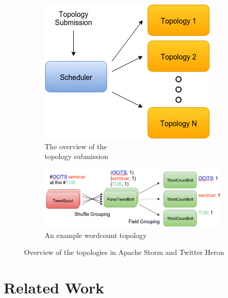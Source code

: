 \documentclass[conference]{IEEEtran}
\begin{document}
\begin{figure}[!h]
\centering
	\begin{subfigure}{.55\columnwidth}
		\includegraphics[width=\columnwidth]{figures/TopologySubmission}
		\caption{The overview of the \\topology submission}
		\label{fig:TopologySubmission}
	\end{subfigure}\hspace{2.9em}
	\begin{subfigure}{1.35\columnwidth}
		\includegraphics[width=\columnwidth]{figures/TopologyWordCount}
		\caption{An example wordcount topology}
		\label{fig:TopologyWordcount}
	\end{subfigure}\hfill
\label{TopologyDescription}
\caption{Overview of the topologies in Apache Storm and Twitter Heron}
\end{figure}

\section{Related Work}
\label{sec:RelatedWork}
\end{document}
